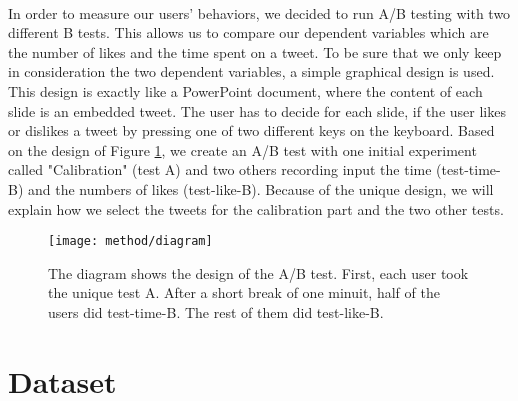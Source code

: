 \paragraph{}
In order to measure our users' behaviors, we decided to run A/B testing with two different B tests. This allows us to compare our dependent variables which are the number of likes and the time spent on a tweet. To be sure that we only keep in consideration the two dependent variables, a simple graphical design is used. This design is exactly like a PowerPoint document, where the content of each slide is an embedded tweet. The user has to decide for each slide, if the user likes or dislikes a tweet by pressing one of two different keys on the keyboard. Based on the design of Figure \ref{fig:a_b_diagram}, we create an A/B test with one initial experiment called "Calibration" (test A) and two others recording input the time (test-time-B) and the numbers of likes (test-like-B). Because of the unique design, we will explain how we select the tweets for the calibration part and the two other tests.

\begin{figure}[h]
\centering 
\texttt{[image: method/diagram]} 
\caption[A/B test design]{The diagram shows the design of the A/B test. First, each user took the unique test A. After a short break of one minuit, half of the users did test-time-B. The rest of them did test-like-B.}
\label{fig:a_b_diagram} 
\end{figure}


\section{Dataset}


